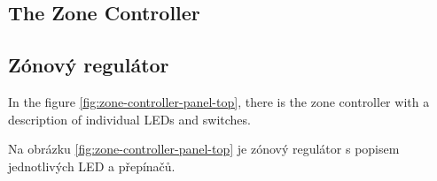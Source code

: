 \newpage
\begin{English}
\subsection{The Zone Controller}
\end{English}

\begin{Czech}
\subsection{Zónový regulátor}
\end{Czech}


\begin{English}
In the figure \ref{fig:zone-controller-panel-top}, there is the zone controller with a description of individual LEDs and switches.
\end{English}

\begin{Czech}
Na obrázku \ref{fig:zone-controller-panel-top} je zónový regulátor s popisem jednotlivých LED a přepínačů.
\end{Czech}


